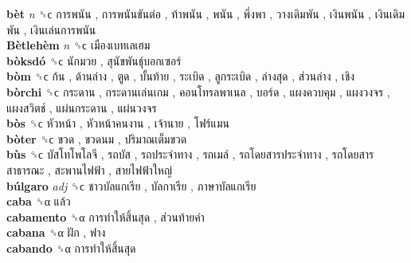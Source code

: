 \textbf{bèt} \emph{n}  ␝ϲ   การพนัน ,  การพนันขันต่อ ,  ท้าพนัน ,  พนัน ,  พึ่งพา ,  วางเดิมพัน ,  เงินพนัน ,  เงินเดิมพัน ,  เงินเล่นการพนัน   \\
\textbf{Bètlehèm} \emph{n}  ␝ϲ   เมืองเบทเลเฮม   \\
\textbf{bòksdó} ␝ϲ   นักมวย ,  สุนัขพันธุ์บอกเซอร์   \\
\textbf{bòm} ␝ϲ   ก้น ,  ด้านล่าง ,  ตูด ,  บั้นท้าย ,  ระเบิด ,  ลูกระเบิด ,  ล่างสุด ,  ส่วนล่าง ,  เชิง   \\
\textbf{bòrchi} ␝ϲ   กระดาน ,  กระดานเล่นเกม ,  คอนโทรลพาเนล ,  บอร์ด ,  แผงควบคุม ,  แผงวงจร ,  แผงสวิตช์ ,  แผ่นกระดาน ,  แผ่นวงจร   \\
\textbf{bòs} ␝ϲ   หัวหน้า ,  หัวหน้าคนงาน ,  เจ้านาย ,  โฟร์แมน   \\
\textbf{bòter} ␝ϲ   ขวด ,  ขวดนม ,  ปริมาณเต็มขวด   \\
\textbf{bùs} ␝ϲ   บัสโทโพโลจี ,  รถบัส ,  รถประจำทาง ,  รถเมล์ ,  รถโดยสารประจำทาง ,  รถโดยสารสาธารณะ ,  สะพานไฟฟ้า ,  สายไฟฟ้าใหญ่   \\
\textbf{búlgaro} \emph{adj}  ␝ϲ   ชาวบัลแกเรีย ,  บัลกาเรีย ,  ภาษาบัลแกเรีย   \\
\textbf{caba} ␝α   แล้ว   \\
\textbf{cabamento} ␝α   การทำให้สิ้นสุด ,  ส่วนท้ายคำ   \\
\textbf{cabana} ␝α   ฝัก ,  ฟาง   \\
\textbf{cabando} ␝α   การทำให้สิ้นสุด   \\
